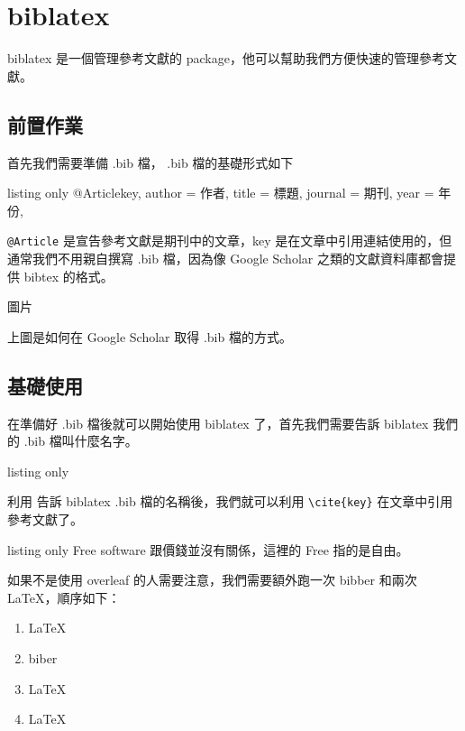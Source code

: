 \chapter{biblatex}

biblatex 是一個管理參考文獻的 package，他可以幫助我們方便快速的管理參考文獻。

\section{前置作業}

首先我們需要準備 .bib 檔， .bib 檔的基礎形式如下

\begin{tcblisting}{listing only}
@Article{key,
author = {作者},
title = {標題},
journal = {期刊},
year = {年份},
}
\end{tcblisting}


\verb`@Article` 是宣告參考文獻是期刊中的文章，key 是在文章中引用連結使用的，但通常我們不用親自撰寫 .bib 檔，因為像 Google Scholar 之類的文獻資料庫都會提供 bibtex 的格式。

圖片

上圖是如何在 Google Scholar 取得 .bib 檔的方式。

\section{基礎使用}

在準備好 .bib 檔後就可以開始使用 biblatex 了，首先我們需要告訴 biblatex 我們的 .bib 檔叫什麼名字。

\begin{tcblisting}{listing only}

\end{tcblisting}

利用 \verb`` 告訴 biblatex .bib 檔的名稱後，我們就可以利用 \verb`\cite{key}` 在文章中引用參考文獻了。

\begin{tcblisting}{listing only}
Free software 跟價錢並沒有關係，這裡的 Free 指的是自由。\cite{stallman2002free}
\end{tcblisting}

如果不是使用 overleaf 的人需要注意，我們需要額外跑一次 bibber 和兩次 \LaTeX ，順序如下：

\begin{enumerate}
\item \LaTeX
\item biber
\item \LaTeX 
\item \LaTeX
\end{enumerate}

